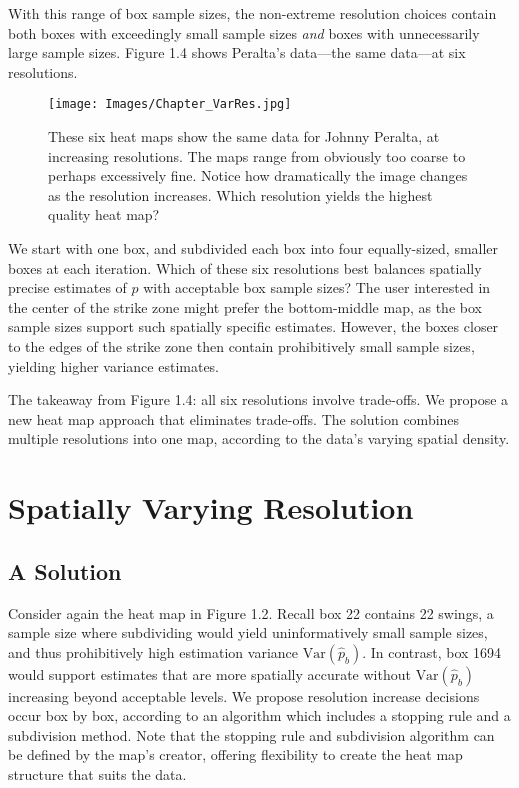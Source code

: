 With this range of box sample sizes, the non-extreme resolution choices contain both boxes with exceedingly small sample sizes {\it and} boxes with unnecessarily large sample sizes. Figure 1.4 shows Peralta's data---the same data---at six resolutions. 
        \begin{figure}[H]
      	\centering
      	\texttt{[image: Images/Chapter\_VarRes.jpg]} 
      	\caption{These six heat maps show the same data for Johnny Peralta, at increasing resolutions. The maps range from obviously too coarse to perhaps excessively fine. Notice how dramatically the image changes as the resolution increases. Which resolution yields the highest quality heat map?}
      	\end{figure} 
We start with one box, and subdivided each box into four equally-sized, smaller boxes at each iteration. Which of these six resolutions best balances spatially precise estimates of $p$ with acceptable box sample sizes? The user interested in the center of the strike zone might prefer the bottom-middle map, as the box sample sizes support such spatially specific estimates. However, the boxes closer to the edges of the strike zone then contain prohibitively small sample sizes, yielding higher variance estimates. 

The takeaway from Figure 1.4: all six resolutions involve trade-offs. We propose a new heat map approach that eliminates trade-offs. The solution combines multiple resolutions into one map, according to the data's varying spatial density.

\section{Spatially Varying Resolution} %

\subsection{A Solution}

Consider again the heat map in Figure 1.2. Recall box 22 contains 22 swings, a sample size where subdividing would yield uninformatively small sample sizes, and thus prohibitively high estimation variance $\text{Var}(\hat{p}_{b})$. In contrast, box 1694 would support estimates that are more spatially accurate without $\text{Var}(\hat{p}_{b})$ increasing beyond acceptable levels. We propose resolution increase decisions occur box by box, according to an algorithm which includes a stopping rule and a subdivision method. Note that the stopping rule and subdivision algorithm can be defined by the map's creator, offering flexibility to create the heat map structure that suits the data. 

